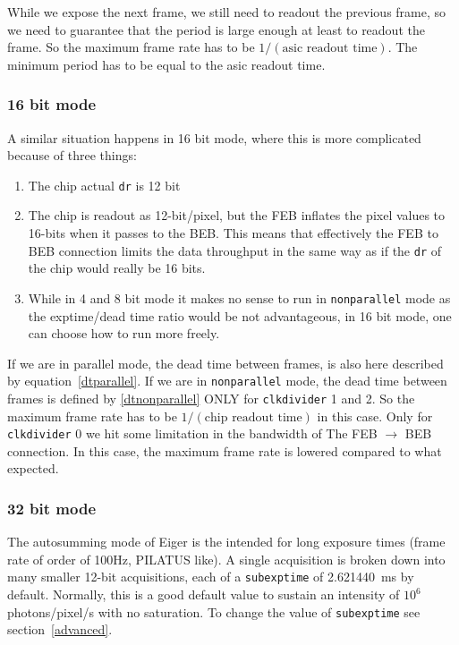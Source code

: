 \documentclass{article}
\begin{document}
While we expose the next frame, we still need to readout the previous frame, so we need to guarantee that the period is large enough at least to readout the frame. So the maximum frame rate has to be $1/(\textrm{asic readout time})$. The minimum period has to be equal to the asic readout time. 

\subsubsection{16 bit mode}

A similar situation happens in 16 bit mode, where this is more complicated because of three things:
\begin{enumerate}
\item The chip actual {\tt{dr}} is 12 bit
\item The chip is readout as 12-bit/pixel, but the FEB inflates the pixel values to 16-bits when it passes to the BEB. This means that effectively the FEB to BEB connection limits the data throughput in the same way as if the {\tt{dr}} of the chip would really be 16 bits.
\item While in 4 and 8 bit mode it makes no sense to run in {\tt{nonparallel}} mode as the exptime/dead time ratio would be not advantageous, in 16 bit mode, one can choose how to run more freely.
\end{enumerate}

If we are in parallel mode, the dead time between frames, is also here described by equation~\ref{dtparallel}. If we are in {\tt{nonparallel}} mode, the dead time between frames is defined by \ref{dtnonparallel} ONLY for {\tt{clkdivider}} 1 and 2. So the maximum frame rate has to be $1/(\textrm{chip readout time})$ in this case. Only for {\tt{clkdivider}} 0 we hit some limitation in the bandwidth of The FEB $\to$ BEB connection. In this case, the maximum frame rate is lowered compared to what expected.

\subsubsection{32 bit mode}
The autosumming mode of Eiger is the intended for long exposure times (frame rate of order of 100Hz, PILATUS like). A single acquisition is broken down into many smaller 12-bit acquisitions, each of a {\tt{subexptime}} of 2.621440~ms by default. Normally, this is a good default value to sustain an intensity of $10^6$ photons/pixel/s with no saturation. To change the value of {\tt{subexptime}} see section~\ref{advanced}. 
\end{document}

